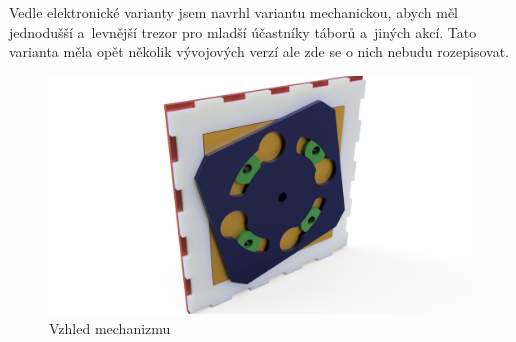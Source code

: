 \label{M3-popis}
Vedle elektronické varianty jsem navrhl variantu mechanickou, abych měl jednodušší a~levnější trezor pro mladší účastníky táborů a~jiných akcí. 
Tato varianta měla opět několik vývojových verzí ale zde se o nich nebudu rozepisovat.

\begin{figure}[h]
	\centering
    \includegraphics[width=\textwidth]{kapitoly/obrazky/M3/SOC_render.png}
    \caption{Vzhled mechanizmu}
    \label{fig:M3}
\end{figure}
